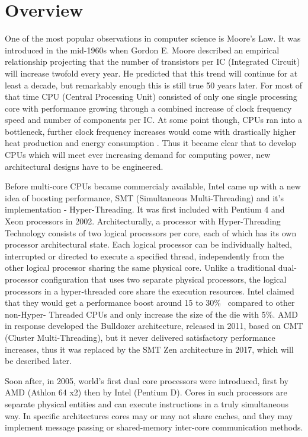 \chapter{Overview}
One of the most popular observations in computer science is Moore's Law.
It was introduced in the mid-1960s when Gordon E. Moore described an empirical relationship \cite{Moore1965}
projecting that the number of transistors per IC (Integrated Circuit) will increase twofold every year.
He predicted that this trend will continue for at least a decade, but remarkably enough this is still true 50 years later. 
For most of that time CPU (Central Processing Unit) consisted of only one single processing core with performance growing through a combined increase of clock frequency speed and number of components per IC. At some point though, CPUs ran into a bottleneck,
further clock frequency increases would come with drastically higher heat production and energy consumption \cite{Illinois}. Thus it became clear that to develop CPUs which will meet ever increasing demand for computing power, new architectural designs have to be engineered.

Before multi-core CPUs became commercialy available, Intel came up with a new idea of boosting performance, SMT (Simultaneous Multi-Threading) and it's implementation - Hyper-Threading. It was first included with Pentium 4 and Xeon processors in 2002. Architecturally, a processor with Hyper-Threading Technology consists of two logical processors per core, each of which has its own processor architectural state. Each logical processor can be individually halted, interrupted or directed to execute a specified thread, independently from the other logical processor sharing the same physical core.
Unlike a traditional dual-processor configuration that uses two separate physical processors, the logical processors in a hyper-threaded core share the execution resources. Intel claimed that they would get a performance boost around 15 to 30\%~\cite{intel} compared to other non-Hyper-
Threaded CPUs and only increase the size of the die with 5\%. AMD in response developed the Bulldozer architecture, released in 2011, based on CMT (Cluster Multi-Threading), but it never delivered satisfactory performance increases, thus it was replaced by the SMT Zen architecture in 2017, which will be described later.

Soon after, in 2005, world's first dual core processors were introduced, first by AMD (Athlon 64 x2) then by Intel (Pentium D). Cores in such processors are separate physical entities and can execute instructions in a truly simultaneous way. In specific architectures cores may or may not share caches, and they may implement message passing or shared-memory inter-core communication methods. 

